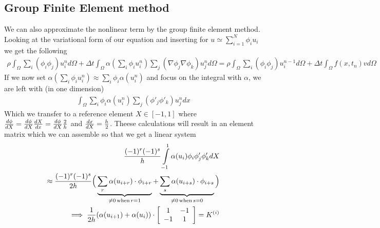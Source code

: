 \documentclass[a4paper,english, 10pt, twoside]{article}
\begin{document}
\subsection{Group Finite Element method}
We can also approximate the nonlinear term by the group finite element method. Looking at the variational form of our equation and inserting 
for $u\simeq \sum\limits_{i=1}^N\phi_iu_i$ we get the following
\begin{align*}
\rho\int_\Omega \sum\limits_i(\phi_i\phi_j)u_i^nd\Omega+\Delta t\int_\Omega \alpha(\sum\limits_i\phi_iu_i^{n})\sum\limits_j(\nabla\phi_j\nabla 
\phi_k)u_j^nd\Omega = \rho\int_\Omega \sum\limits_i(\phi_i\phi_j)u_i^{n-1}d\Omega +\Delta t\int_\Omega f(x,t_n)vd\Omega
\end{align*}
If we now set $\alpha(\sum\limits_i\phi_iu_i^{n})\approx \sum\limits_i\phi_i\alpha(u_i^{n})$ and focus on the integral with $\alpha$, we are left with
(in one dimension)
\begin{align*}
 \int_\Omega \sum\limits_i\phi_i\alpha(u_i^{n})\sum\limits_j(\phi'_j\phi'_k)u_j^ndx
\end{align*}
Which we transfer to a reference element $X\in[-1,1]$ where ${d \phi \over d X} = {d\phi \over dX}{dX \over dx} = {d\phi \over dX}{2\over h}$ 
and ${dx\over dX}={h\over 2}$. Theese calculations will result in an element matrix which we can assemble so that we get a linear system
\begin{align*}
 {(-1)^r(-1)^s\over h}\int\limits_{-1}^1\alpha(u_i)\phi_i\phi'_j\phi'_kdX \\
 \approx{(-1)^r(-1)^s\over 2h}\Big(\underbrace{\sum\limits_r\alpha(u_{i+r})\cdot\phi_{i+r}}_{\neq0 \,\text{when}\, r=1} +
 \underbrace{\sum\limits_s\alpha(u_{i+s})\cdot\phi_{i+s}}_{\neq0 \,\text{when}\, s=0}\Big) \\
 \implies {1\over 2h}(\alpha(u_{i+1})+\alpha(u_i))\cdot\left[\begin{array}{c c}
                                                        1&-1\\
                                                        -1&1
                                                       \end{array}\right] =K^{(i)}
\end{align*}
\end{document}
